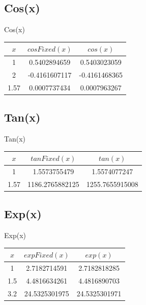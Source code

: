 \documentclass{beamer}
\theoremstyle{remark}
\begin{document}
\subsection{Cos(x)}
\begin{frame}{Cos(x)}
\begin{table}[h!]
\centering
\begin{tabular}{|c|c|c|}
\hline
$x$ & $cosFixed(x)$ & $cos(x)$ \\
\hline
1    & 0.5402894659    & 0.5403023059 \\
2    & -0.4161607117   & -0.4161468365 \\
1.57 & 0.0007737434    & 0.0007963267 \\
\hline
\end{tabular}
\end{table}
\end{frame}

\subsection{Tan(x)}
\begin{frame}{Tan(x)}
\begin{table}[h!]
\centering
\begin{tabular}{|c|c|c|}
\hline
$x$ & $tanFixed(x)$ & $tan(x)$ \\
\hline
1    & 1.5573755479   & 1.5574077247 \\
1.57 & 1186.2765882125 & 1255.7655915008 \\
\hline
\end{tabular}
\end{table}    
\end{frame}

\subsection{Exp(x)}
\begin{frame}{Exp(x)}
\begin{table}[h!]
\centering
\begin{tabular}{|c|c|c|}
\hline
$x$ & $expFixed(x)$ & $exp(x)$ \\
\hline
1   & 2.7182714591   & 2.7182818285 \\
1.5 & 4.4816634261   & 4.4816890703 \\
3.2 & 24.5325301975  & 24.5325301971 \\
\hline
\end{tabular}
\end{table}
\end{frame}
\end{document}
